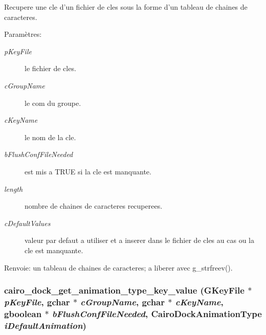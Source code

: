 Recupere une cle d'un fichier de cles sous la forme d'un tableau de chaines de caracteres. \begin{Desc}
\item[Param\`{e}tres:]
\begin{description}
\item[{\em p\-Key\-File}]le fichier de cles. \item[{\em c\-Group\-Name}]le com du groupe. \item[{\em c\-Key\-Name}]le nom de la cle. \item[{\em b\-Flush\-Conf\-File\-Needed}]est mis a TRUE si la cle est manquante. \item[{\em length}]nombre de chaines de caracteres recuperees. \item[{\em c\-Default\-Values}]valeur par defaut a utiliser et a inserer dans le fichier de cles au cas ou la cle est manquante. \end{description}
\end{Desc}
\begin{Desc}
\item[Renvoie:]un tableau de chaines de caracteres; a liberer avec g\_\-strfreev(). \end{Desc}
\subsubsection{ cairo\_\-dock\_\-get\_\-animation\_\-type\_\-key\_\-value (GKey\-File $\ast$ {\em p\-Key\-File}, gchar $\ast$ {\em c\-Group\-Name}, gchar $\ast$ {\em c\-Key\-Name}, gboolean $\ast$ {\em b\-Flush\-Conf\-File\-Needed}, {\bf Cairo\-Dock\-Animation\-Type} {\em i\-Default\-Animation})}\label{cairo-dock-config_8c_1399e889ecff5ac390552c643c01ea43}


